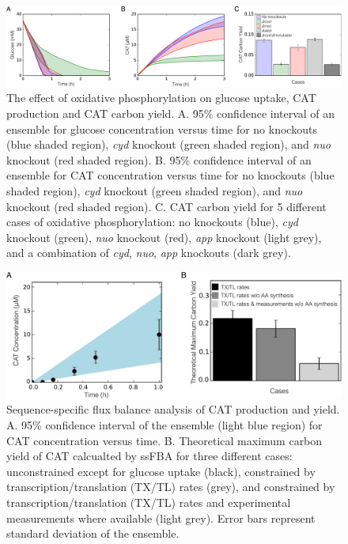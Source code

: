 \documentclass[12pt]{article}
\begin{document}
\begin{figure}[ht]
\centering
\includegraphics[width=1\textwidth]{./Figures/oxphos_ko.pdf}
\caption{The effect of oxidative phosphorylation on glucose uptake, CAT production and CAT carbon yield. A. 95\% confidence interval of an ensemble for glucose concentration versus time for no knockouts (blue shaded region), \textit{cyd} knockout (green shaded region), and \textit{nuo} knockout (red shaded region). B. 95\% confidence interval of an ensemble for CAT concentration versus time for no knockouts (blue shaded region), \textit{cyd} knockout (green shaded region), and \textit{nuo} knockout (red shaded region). C. CAT carbon yield for 5 different cases of oxidative phosphorylation: no knockouts (blue), \textit{cyd} knockout (green), \textit{nuo} knockout (red), \textit{app} knockout (light grey), and a combination of \textit{cyd}, \textit{nuo}, \textit{app} knockouts (dark grey).}
\label{fig:oxphos_ko}
\end{figure}
\clearpage

\begin{figure}[ht]
\centering
\includegraphics[width=1\textwidth]{./Figures/CAT_prod_yield.pdf}
\caption{Sequence-specific flux balance analysis of CAT production and yield. A. 95\% confidence interval of the ensemble (light blue region) for CAT concentration versus time. B. Theoretical maximum carbon yield of CAT calcualted by ssFBA for three different cases: unconstrained except for glucose uptake (black), constrained by transcription/translation (TX/TL) rates (grey), and constrained by transcription/translation (TX/TL) rates and experimental measurements where available (light grey). Error bars represent standard deviation of the ensemble.}
\label{fig:CATProdYield}
\end{figure}
\clearpage
\end{document}
